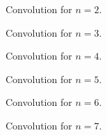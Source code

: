 \medskip
\begin{figure}[h]
    \centering
    \caption{Convolution for $n=2$.}
    \label{fig:conv_n2}
\end{figure}

\medskip

\begin{figure}[h!]
    \centering
    \caption{Convolution for $n=3$.}
    \label{fig:conv_n3}
\end{figure}
\begin{figure}[h!]
    \centering
    \caption{Convolution for $n=4$.}
    \label{fig:conv_n4}
\end{figure}
\begin{figure}[h!]
    \centering
    \caption{Convolution for $n=5$.}
    \label{fig:conv_n5}
\end{figure}
\begin{figure}[h!]
    \centering
    \caption{Convolution for $n=6$.}
    \label{fig:conv_n6}
\end{figure}
\begin{figure}[h!]
    \centering
    \caption{Convolution for $n=7$.}
    \label{fig:conv_n7}
\end{figure}
